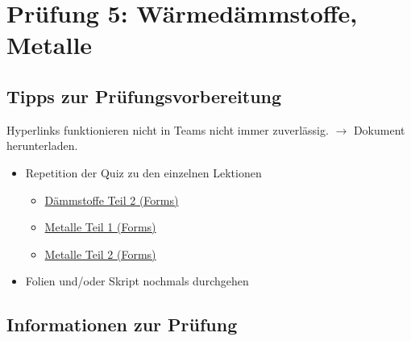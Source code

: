 

\newcommand{\blattname}{Prüfung 5: Wärmedämmstoffe, Metalle}
\newcommand{\Added}[1]{\textcolor{blue}{#1}}



\section*{\blattname}
\subsection*{Tipps zur Prüfungsvorbereitung}
Hyperlinks funktionieren nicht in Teams nicht immer zuverlässig. $\rightarrow$ Dokument herunterladen.
\begin{itemize}
	\item Repetition der Quiz zu den einzelnen Lektionen
	\begin{itemize}[]

		\item \href{https://forms.office.com/Pages/ResponsePage.aspx?id=HsbbSHAOrE6HJuK4duaJwdUERlKbBqZKkaxTc87ge2NUNkdGRTVJS0NaVkRRMTBMMkoxNFpCUVhIRy4u}{Dämmstoffe Teil 2 (Forms)}
		\item \href{https://forms.office.com/Pages/ResponsePage.aspx?id=HsbbSHAOrE6HJuK4duaJwdUERlKbBqZKkaxTc87ge2NUOVc0UVJWTlREMTFJRlI4TE1YMzI2WEYxTC4u}{Metalle Teil 1 (Forms)}
		\item \href{https://forms.office.com/Pages/ResponsePage.aspx?id=HsbbSHAOrE6HJuK4duaJwdUERlKbBqZKkaxTc87ge2NURjBRS1VLNUxSM0M2NUxLNThGT0ZFMzNOTy4u}{Metalle Teil 2 (Forms)}
	\end{itemize}
	\item Folien und/oder Skript nochmals durchgehen
\end{itemize}

\subsection*{Informationen zur Prüfung}

